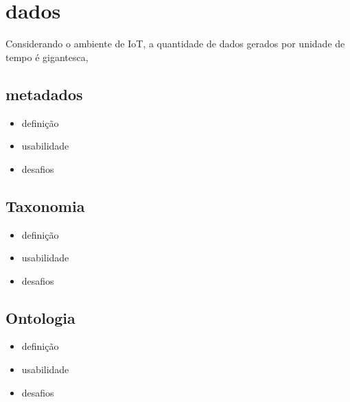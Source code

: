 \section{dados}%
	Considerando o ambiente de \acrshort{IoT}, a quantidade de dados gerados por unidade de tempo é gigantesca,

	\subsection{metadados}
		\begin{itemize}
			\item definição
			\item usabilidade
			\item desafios
		\end{itemize}
	\subsection{Taxonomia}
		\begin{itemize}
			\item definição
			\item usabilidade
			\item desafios
		\end{itemize}
	\subsection{Ontologia}
		\begin{itemize}
			\item definição
		 	\item usabilidade
			\item desafios
		\end{itemize}

